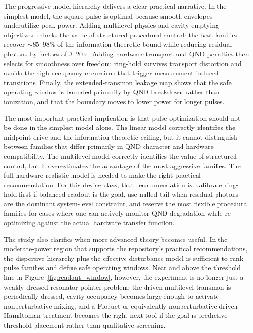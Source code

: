 \documentclass[aps,pra,twocolumn,reprint,amsmath,amssymb]{revtex4-2}
\begin{document}
The progressive model hierarchy delivers a clear practical narrative. In the simplest model, the square pulse is optimal because smooth envelopes underutilize peak power. Adding multilevel physics and cavity emptying objectives unlocks the value of structured procedural control: the best families recover $\sim$85--98\% of the information-theoretic bound while reducing residual photons by factors of 3--20$\times$. Adding hardware transport and QND penalties then selects for smoothness over freedom: ring-hold survives transport distortion and avoids the high-occupancy excursions that trigger measurement-induced transitions. Finally, the extended-transmon leakage map shows that the safe operating window is bounded primarily by QND breakdown rather than ionization, and that the boundary moves to lower power for longer pulses.

The most important practical implication is that pulse optimization should not be done in the simplest model alone. The linear model correctly identifies the midpoint drive and the information-theoretic ceiling, but it cannot distinguish between families that differ primarily in QND character and hardware compatibility. The multilevel model correctly identifies the value of structured control, but it overestimates the advantage of the most aggressive families. The full hardware-realistic model is needed to make the right practical recommendation. For this device class, that recommendation is: calibrate ring-hold first if balanced readout is the goal, use nulled-tail when residual photons are the dominant system-level constraint, and reserve the most flexible procedural families for cases where one can actively monitor QND degradation while re-optimizing against the actual hardware transfer function.

The study also clarifies when more advanced theory becomes useful. In the moderate-power region that supports the repository's practical recommendations, the dispersive hierarchy plus the effective disturbance model is sufficient to rank pulse families and define safe operating windows. Near and above the threshold line in Figure~\ref{fig:readout_window}, however, the experiment is no longer just a weakly dressed resonator-pointer problem: the driven multilevel transmon is periodically dressed, cavity occupancy becomes large enough to activate nonperturbative mixing, and a Floquet or equivalently nonperturbative driven-Hamiltonian treatment becomes the right next tool if the goal is predictive threshold placement rather than qualitative screening.
\end{document}
